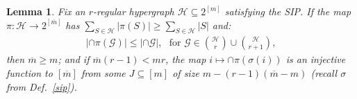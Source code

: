 \documentclass[journal, twocolumn]{IEEEtran}
\newtheorem{lemma}{Lemma}
\begin{document}
\begin{lemma}\label{NonEmptyLemma} 
Fix an $r$-regular hypergraph $\mathcal{H} \subseteq 2^{[m]}$ satisfying the SIP. If the map $\pi: \mathcal{H} \to 2^{[\overline m]}$ has $\sum_{S \in \mathcal{H}} |\pi(S)| \geq \sum_{S \in \mathcal{H}} |S|$ and:
\begin{align}\label{cond}
	|\cap \pi(\mathcal{G})| \leq |\cap \mathcal{G} |,\ \ \   \text{for } \mathcal{G} \in {\mathcal{H} \choose r} \cup {\mathcal{H} \choose r+1},
\end{align}
%
then $\overline m \geq m$; and if $\overline m  (r-1) < mr$, the map $i \mapsto \cap \pi(\sigma(i))$ is an injective function to $[\overline m]$ from some $J \subseteq [m]$ of size $m - (r-1)(\overline m - m)$ (recall $\sigma$ from Def.~\ref{sip}).  %
\end{lemma}
\end{document}
